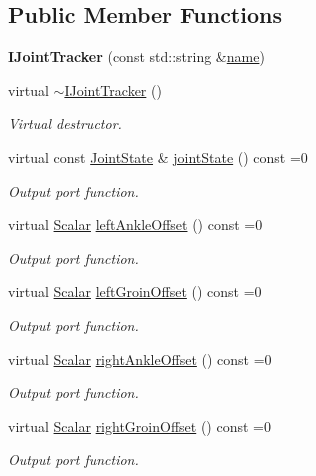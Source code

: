 \subsection*{Public Member Functions}
\begin{DoxyCompactItemize}
\item 
{\bfseries I\+Joint\+Tracker} (const std\+::string \&\hyperlink{classow_1_1GenericModuleBase_a4b712883728cdbab7779e27f9a23689c}{name})\hypertarget{classow_1_1IJointTracker_a8578fc494ac0ff9ff9a0b2e2b97e9d01}{}\label{classow_1_1IJointTracker_a8578fc494ac0ff9ff9a0b2e2b97e9d01}

\item 
virtual \hyperlink{classow_1_1IJointTracker_ae26362321b1e6dc8150e978f6cbbe387}{$\sim$\+I\+Joint\+Tracker} ()\hypertarget{classow_1_1IJointTracker_ae26362321b1e6dc8150e978f6cbbe387}{}\label{classow_1_1IJointTracker_ae26362321b1e6dc8150e978f6cbbe387}

\begin{DoxyCompactList}\small\item\em Virtual destructor. \end{DoxyCompactList}\item 
virtual const \hyperlink{classow__core_1_1JointState}{Joint\+State} \& \hyperlink{classow_1_1IJointTracker_a8a4ce3e09de0d9acfab14b80a62b9352}{joint\+State} () const =0
\begin{DoxyCompactList}\small\item\em Output port function. \end{DoxyCompactList}\item 
virtual \hyperlink{types_8h_ac412879ee4a239c8032aa2d647f4a74a}{Scalar} \hyperlink{classow_1_1IJointTracker_a5de973fc5cf10ad744b5751af37892a8}{left\+Ankle\+Offset} () const =0
\begin{DoxyCompactList}\small\item\em Output port function. \end{DoxyCompactList}\item 
virtual \hyperlink{types_8h_ac412879ee4a239c8032aa2d647f4a74a}{Scalar} \hyperlink{classow_1_1IJointTracker_a0ff75a18547b825e1ffa392e1d5c5867}{left\+Groin\+Offset} () const =0
\begin{DoxyCompactList}\small\item\em Output port function. \end{DoxyCompactList}\item 
virtual \hyperlink{types_8h_ac412879ee4a239c8032aa2d647f4a74a}{Scalar} \hyperlink{classow_1_1IJointTracker_a7310e8148f5eb9240edee6ffe54e6c1f}{right\+Ankle\+Offset} () const =0
\begin{DoxyCompactList}\small\item\em Output port function. \end{DoxyCompactList}\item 
virtual \hyperlink{types_8h_ac412879ee4a239c8032aa2d647f4a74a}{Scalar} \hyperlink{classow_1_1IJointTracker_abe7480bfd77df5330890aabdce15fea5}{right\+Groin\+Offset} () const =0
\begin{DoxyCompactList}\small\item\em Output port function. \end{DoxyCompactList}\end{DoxyCompactItemize}
